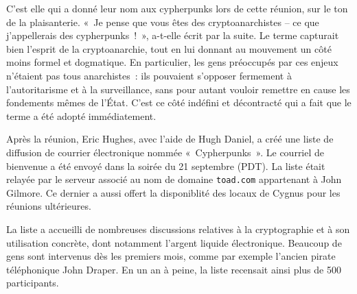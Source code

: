 C'est elle qui a donné leur nom aux cypherpunks lors de cette réunion, sur le ton de la plaisanterie. «~Je pense que vous êtes des cryptoanarchistes -- ce que j'appellerais des cypherpunks~!~», a-t-elle écrit par la suite. Le terme capturait bien l'esprit de la cryptoanarchie, tout en lui donnant au mouvement un côté moins formel et dogmatique. En particulier, les gens préoccupés par ces enjeux n'étaient pas tous anarchistes~: ils pouvaient s'opposer fermement à l'autoritarisme et à la surveillance, sans pour autant vouloir remettre en cause les fondements mêmes de l'État. C'est ce côté indéfini et décontracté qui a fait que le terme a été adopté immédiatement. %

Après la réunion, Eric Hughes, avec l'aide de Hugh Daniel, a créé une liste de diffusion de courrier électronique nommée «~Cypherpunks~». Le courriel de bienvenue a été envoyé dans la soirée du 21 septembre (PDT). La liste était relayée par le serveur associé au nom de domaine \texttt{toad.com} appartenant à John Gilmore. Ce dernier a aussi offert la disponiblité des locaux de Cygnus pour les réunions ultérieures.

La liste a accueilli de nombreuses discussions relatives à la cryptographie et à son utilisation concrète, dont notamment l'argent liquide électronique. Beaucoup de gens sont intervenus dès les premiers mois, comme par exemple l'ancien pirate téléphonique John Draper. En un an à peine, la liste recensait ainsi plus de 500 participants. %

